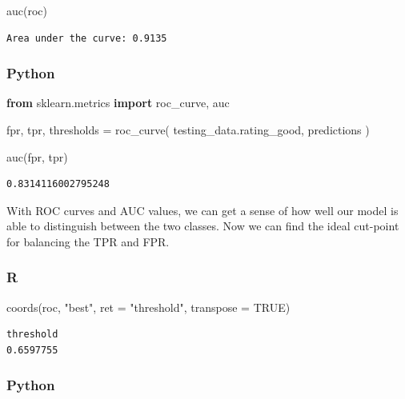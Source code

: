 \documentclass[
  letterpaper,
]{krantz}
\newenvironment{Shaded}{}{}
\newcommand{\AttributeTok}[1]{\textcolor[rgb]{0.49,0.56,0.16}{#1}}
\newcommand{\ConstantTok}[1]{\textcolor[rgb]{0.53,0.00,0.00}{#1}}
\newcommand{\FunctionTok}[1]{\textcolor[rgb]{0.02,0.16,0.49}{#1}}
\newcommand{\ImportTok}[1]{\textcolor[rgb]{0.00,0.50,0.00}{\textbf{#1}}}
\newcommand{\NormalTok}[1]{#1}
\newcommand{\OperatorTok}[1]{\textcolor[rgb]{0.40,0.40,0.40}{#1}}
\newcommand{\StringTok}[1]{\textcolor[rgb]{0.25,0.44,0.63}{#1}}
\begin{document}
\begin{Shaded}
\begin{Highlighting}[]
\FunctionTok{auc}\NormalTok{(roc)}
\end{Highlighting}
\end{Shaded}

\begin{verbatim}
Area under the curve: 0.9135
\end{verbatim}

\subsubsection{Python}

\begin{Shaded}
\begin{Highlighting}[]
\ImportTok{from}\NormalTok{ sklearn.metrics }\ImportTok{import}\NormalTok{ roc\_curve, auc}

\NormalTok{fpr, tpr, thresholds }\OperatorTok{=}\NormalTok{ roc\_curve(}
\NormalTok{    testing\_data.rating\_good, }
\NormalTok{    predictions}
\NormalTok{)}

\NormalTok{auc(fpr, tpr)}
\end{Highlighting}
\end{Shaded}

\begin{verbatim}
0.8314116002795248
\end{verbatim}

With ROC curves and AUC values, we can get a sense of how well our model
is able to distinguish between the two classes. Now we can find the
ideal cut-point for balancing the TPR and FPR.

\subsubsection{R}

\begin{Shaded}
\begin{Highlighting}[]
\FunctionTok{coords}\NormalTok{(roc, }\StringTok{"best"}\NormalTok{, }\AttributeTok{ret =} \StringTok{"threshold"}\NormalTok{, }\AttributeTok{transpose =} \ConstantTok{TRUE}\NormalTok{)}
\end{Highlighting}
\end{Shaded}

\begin{verbatim}
threshold 
0.6597755 
\end{verbatim}

\subsubsection{Python}
\end{document}
